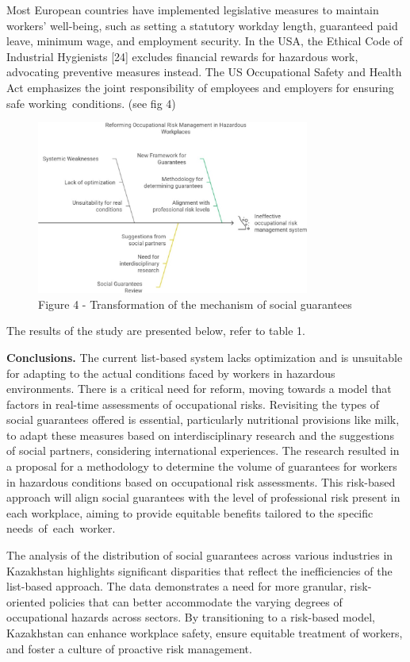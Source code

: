 \begin{multicols}{2}
Most European countries have implemented legislative measures to
maintain workers'{} well-being, such as setting a
statutory workday length, guaranteed paid leave, minimum wage, and
employment security. In the USA, the Ethical Code of Industrial
Hygienists {[}24{]} excludes financial rewards for hazardous work,
advocating preventive measures instead. The US Occupational Safety and
Health Act emphasizes the joint responsibility of employees and
employers for ensuring safe working~conditions. (see fig 4)
\end{multicols}

\begin{figure}[H]
	\centering
	\includegraphics[width=0.8\textwidth]{media/gorn/image5}
	\caption*{Figure 4 - Transformation of the mechanism of social guarantees}
\end{figure}

\begin{multicols}{2}
The results of the study are presented below, refer to table 1.

{\bfseries Conclusions.} The current list-based system lacks optimization
and is unsuitable for adapting to the actual conditions faced by workers
in hazardous environments. There is a critical need for reform, moving
towards a model that factors in real-time assessments of occupational
risks. Revisiting the types of social guarantees offered is essential,
particularly nutritional provisions like milk, to adapt these measures
based on interdisciplinary research and the suggestions of social
partners, considering international experiences. The research resulted
in a proposal for a methodology to determine the volume of guarantees
for workers in hazardous conditions based on occupational risk
assessments. This risk-based approach will align social guarantees with
the level of professional risk present in each workplace, aiming to
provide equitable benefits tailored to the specific
needs~of~each~worker.

The analysis of the distribution of social guarantees across various
industries in Kazakhstan highlights significant disparities that reflect
the inefficiencies of the list-based approach. The data demonstrates a
need for more granular, risk-oriented policies that can better
accommodate the varying degrees of occupational hazards across sectors.
By transitioning to a risk-based model, Kazakhstan can enhance workplace
safety, ensure equitable treatment of workers, and foster a culture of
proactive risk management.
\end{multicols}

